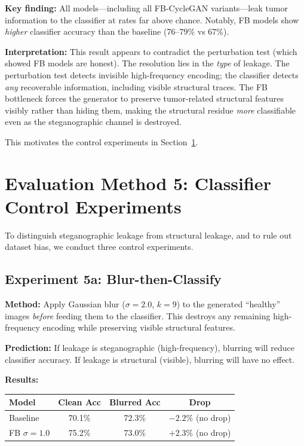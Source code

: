 \documentclass[11pt,a4paper]{article}
\theoremstyle{definition}
\begin{document}
\textbf{Key finding:} All models---including all FB-CycleGAN variants---leak tumor information to the classifier at rates far above chance. Notably, FB models show \emph{higher} classifier accuracy than the baseline (76--79\% vs 67\%).

\textbf{Interpretation:} This result appears to contradict the perturbation test (which showed FB models are honest). The resolution lies in the \emph{type} of leakage. The perturbation test detects invisible high-frequency encoding; the classifier detects \emph{any} recoverable information, including visible structural traces. The FB bottleneck forces the generator to preserve tumor-related structural features visibly rather than hiding them, making the structural residue \emph{more} classifiable even as the steganographic channel is destroyed.

This motivates the control experiments in Section~\ref{sec:controls}.

\section{Evaluation Method 5: Classifier Control Experiments}
\label{sec:controls}

To distinguish steganographic leakage from structural leakage, and to rule out dataset bias, we conduct three control experiments.

\subsection{Experiment 5a: Blur-then-Classify}

\textbf{Method:} Apply Gaussian blur ($\sigma = 2.0$, $k = 9$) to the generated ``healthy'' images \emph{before} feeding them to the classifier. This destroys any remaining high-frequency encoding while preserving visible structural features.

\textbf{Prediction:} If leakage is steganographic (high-frequency), blurring will reduce classifier accuracy. If leakage is structural (visible), blurring will have no effect.

\textbf{Results:}

\begin{center}
\begin{tabular}{lccc}
\toprule
Model & Clean Acc & Blurred Acc & Drop \\
\midrule
Baseline & 70.1\% & 72.3\% & $-2.2\%$ (no drop) \\
FB $\sigma=1.0$ & 75.2\% & 73.0\% & $+2.3\%$ (no drop) \\
\bottomrule
\end{tabular}
\end{center}
\end{document}
